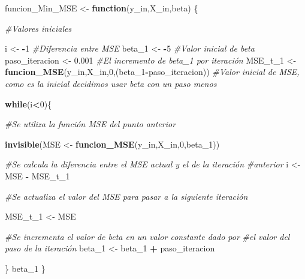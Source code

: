 \documentclass[
]{article}
\newenvironment{Shaded}{\begin{snugshade}}{\end{snugshade}}
\newcommand{\CommentTok}[1]{\textcolor[rgb]{0.56,0.35,0.01}{\textit{#1}}}
\newcommand{\ControlFlowTok}[1]{\textcolor[rgb]{0.13,0.29,0.53}{\textbf{#1}}}
\newcommand{\DecValTok}[1]{\textcolor[rgb]{0.00,0.00,0.81}{#1}}
\newcommand{\FloatTok}[1]{\textcolor[rgb]{0.00,0.00,0.81}{#1}}
\newcommand{\FunctionTok}[1]{\textcolor[rgb]{0.13,0.29,0.53}{\textbf{#1}}}
\newcommand{\NormalTok}[1]{#1}
\newcommand{\OtherTok}[1]{\textcolor[rgb]{0.56,0.35,0.01}{#1}}
\newcommand{\SpecialCharTok}[1]{\textcolor[rgb]{0.81,0.36,0.00}{\textbf{#1}}}
\begin{document}
\begin{Shaded}
\begin{Highlighting}[]
\NormalTok{funcion\_Min\_MSE }\OtherTok{\textless{}{-}} \ControlFlowTok{function}\NormalTok{(y\_in,X\_in,beta) \{}

\CommentTok{\#Valores iniciales}

\NormalTok{i }\OtherTok{\textless{}{-}} \SpecialCharTok{{-}}\DecValTok{1} \CommentTok{\#Diferencia entre MSE}
\NormalTok{beta\_1 }\OtherTok{\textless{}{-}} \SpecialCharTok{{-}}\DecValTok{5} \CommentTok{\#Valor inicial de beta}
\NormalTok{paso\_iteracion }\OtherTok{\textless{}{-}} \FloatTok{0.001} \CommentTok{\#El incremento de beta\_1 por iteración}
\NormalTok{MSE\_t\_1 }\OtherTok{\textless{}{-}} \FunctionTok{funcion\_MSE}\NormalTok{(y\_in,X\_in,}\DecValTok{0}\NormalTok{,(beta\_1}\SpecialCharTok{{-}}\NormalTok{paso\_iteracion)) }\CommentTok{\#Valor inicial de MSE, como es la inicial decidimos usar beta con un paso menos}

\ControlFlowTok{while}\NormalTok{(i}\SpecialCharTok{\textless{}}\DecValTok{0}\NormalTok{)\{}
  
  \CommentTok{\#Se utiliza la función MSE del punto anterior}
  
  \FunctionTok{invisible}\NormalTok{(MSE }\OtherTok{\textless{}{-}} \FunctionTok{funcion\_MSE}\NormalTok{(y\_in,X\_in,}\DecValTok{0}\NormalTok{,beta\_1))}
  
  \CommentTok{\#Se calcula la diferencia entre el MSE actual y el de la iteración}
  \CommentTok{\#anterior}
\NormalTok{  i }\OtherTok{\textless{}{-}}\NormalTok{ MSE }\SpecialCharTok{{-}}\NormalTok{ MSE\_t\_1}
  
  \CommentTok{\#Se actualiza el valor del MSE para pasar a la siguiente iteración}
  
\NormalTok{  MSE\_t\_1 }\OtherTok{\textless{}{-}}\NormalTok{ MSE}
  
  \CommentTok{\#Se incrementa el valor de beta en un valor constante dado por}
  \CommentTok{\#el valor del paso de la iteración}
\NormalTok{  beta\_1 }\OtherTok{\textless{}{-}}\NormalTok{ beta\_1 }\SpecialCharTok{+}\NormalTok{ paso\_iteracion}
  
\NormalTok{  \}}
\NormalTok{beta\_1}
\NormalTok{\}}
\end{Highlighting}
\end{Shaded}
\end{document}
